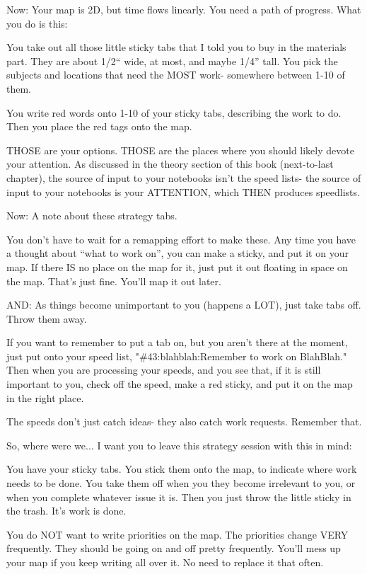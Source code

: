 \documentclass[oneside]{book}
\begin{document}
Now: Your map is 2D, but time flows linearly. You need a path of
progress. What you do is this:

You take out all those little sticky tabs that I told you to buy in
the materials part. They are about 1/2`` wide, at most, and maybe 1/4''
tall. You pick the subjects and locations that need the MOST work-
somewhere between 1-10 of them.

You write red words onto 1-10 of your sticky tabs, describing the work
to do. Then you place the red tags onto the map.

THOSE are your options. THOSE are the places where you should likely
devote your attention. As discussed in the theory section of this book
(next-to-last chapter), the source of input to your notebooks isn't
the speed lists- the source of input to your notebooks is your
ATTENTION, which THEN produces speedlists.

Now: A note about these strategy tabs.

You don't have to wait for a remapping effort to make these. Any time
you have a thought about ``what to work on'', you can make a sticky, and
put it on your map. If there IS no place on the map for it, just put
it out floating in space on the map. That's just fine. You'll map it
out later.

AND: As things become unimportant to you (happens a LOT), just take
tabs off. Throw them away.

If you want to remember to put a tab on, but you aren't there at the
moment, just put onto your speed list, "\#43:blahblah:Remember to work
on BlahBlah." Then when you are processing your speeds, and you see
that, if it is still important to you, check off the speed, make a red
sticky, and put it on the map in the right place.

The speeds don't just catch ideas- they also catch work
requests. Remember that.

So, where were we... I want you to leave this strategy session with
this in mind:

You have your sticky tabs. You stick them onto the map, to indicate
where work needs to be done. You take them off when you they become
irrelevant to you, or when you complete whatever issue it is. Then you
just throw the little sticky in the trash. It's work is done.

You do NOT want to write priorities on the map. The priorities change
VERY frequently. They should be going on and off pretty
frequently. You'll mess up your map if you keep writing all over
it. No need to replace it that often.
\end{document}
